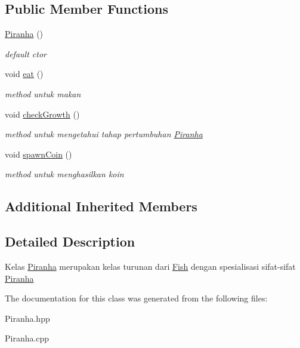 \subsection*{Public Member Functions}
\begin{DoxyCompactItemize}
\item 
\mbox{\label{classPiranha_a7e3a4c5c7f458c16717c8cb997fc0331}} 
\hyperlink{classPiranha_a7e3a4c5c7f458c16717c8cb997fc0331}{Piranha} ()
\begin{DoxyCompactList}\small\item\em default ctor \end{DoxyCompactList}\item 
\mbox{\label{classPiranha_ac48c0256edd56c427b3d82f6e0d4df82}} 
void \hyperlink{classPiranha_ac48c0256edd56c427b3d82f6e0d4df82}{eat} ()
\begin{DoxyCompactList}\small\item\em method untuk makan \end{DoxyCompactList}\item 
\mbox{\label{classPiranha_ad35beb897ca7281e3792faf8211e39a3}} 
void \hyperlink{classPiranha_ad35beb897ca7281e3792faf8211e39a3}{check\+Growth} ()
\begin{DoxyCompactList}\small\item\em method untuk mengetahui tahap pertumbuhan \hyperlink{classPiranha}{Piranha} \end{DoxyCompactList}\item 
\mbox{\label{classPiranha_ad17da28a5556a91170fb6bfe4e331b82}} 
void \hyperlink{classPiranha_ad17da28a5556a91170fb6bfe4e331b82}{spawn\+Coin} ()
\begin{DoxyCompactList}\small\item\em method untuk menghasilkan koin \end{DoxyCompactList}\end{DoxyCompactItemize}
\subsection*{Additional Inherited Members}


\subsection{Detailed Description}
Kelas \hyperlink{classPiranha}{Piranha} merupakan kelas turunan dari \hyperlink{classFish}{Fish} dengan spesialisasi sifat-\/sifat \hyperlink{classPiranha}{Piranha} 

The documentation for this class was generated from the following files\+:\begin{DoxyCompactItemize}
\item 
Piranha.\+hpp\item 
Piranha.\+cpp\end{DoxyCompactItemize}
